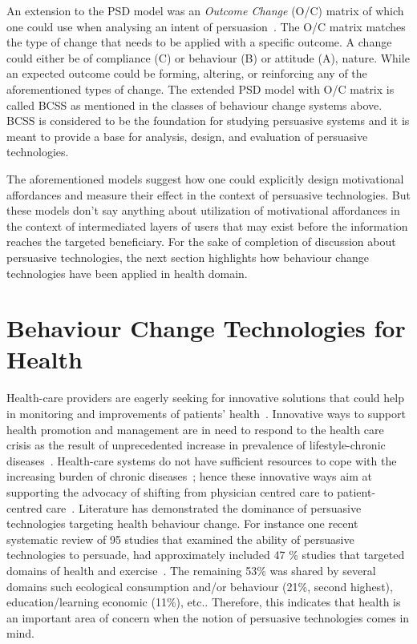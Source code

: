 An extension to the PSD model was an \emph{Outcome Change} (O/C) matrix of which one could use when analysing an intent of persuasion~\citep{Oinas-Kukkonen:foundation}. The O/C matrix matches the type of change that needs to be applied with a specific outcome. A change could either be of compliance (C) or behaviour (B) or attitude (A), nature. While an expected outcome could be forming, altering, or reinforcing any of the aforementioned types of change. The extended PSD model with O/C matrix is called BCSS as mentioned in the classes of behaviour change systems above. BCSS is considered to be the foundation for studying persuasive systems and it is meant to provide a base for analysis, design, and evaluation of persuasive technologies.
 
The aforementioned models suggest how one could explicitly design motivational affordances and measure their effect in the context of persuasive technologies. But these models don't say anything about utilization of motivational affordances in the context of intermediated layers of users that may exist before the information reaches the targeted beneficiary. For the sake of completion of discussion about persuasive technologies, the next section highlights how behaviour change technologies have been applied in health domain.

\section{Behaviour Change Technologies for Health}
Health-care providers are eagerly seeking for innovative solutions that could help in monitoring and improvements of patients' health~\citep{higgins2016smartphone}. Innovative ways to support health promotion and management are in need to respond to the health care crisis as the result of unprecedented increase in prevalence of lifestyle-chronic diseases~\citep{arsand:mobile}. Health-care systems do not have sufficient resources to cope with the increasing burden of chronic diseases~\citep{quinn2008welldoc,arsand:mobile}; hence these innovative ways aim at supporting the advocacy of shifting from physician centred care to patient-centred care~\citep{higgins2016smartphone,korhonen2010personal}.  Literature has demonstrated the dominance of persuasive technologies targeting health behaviour change. For instance one recent systematic review of 95 studies that examined the ability of persuasive technologies to persuade, had approximately included 47 \% studies that  targeted domains of health and exercise~\citep{hamari2014persuasive}. The remaining 53\% was shared by several domains such ecological consumption and/or behaviour (21\%, second highest), education/learning economic (11\%), etc.. Therefore, this indicates that health is an important area of concern when the notion of persuasive technologies comes in mind.

